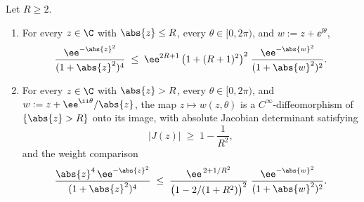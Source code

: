 \begin{lemma}\label{lem:weight-shift}
Let $R \ge 2$.
\begin{enumerate}[\rm(i)]
\item For every $z \in \C$ with $\abs{z}\le R$, every $\theta \in
[0,2\pi)$, and $w := z + \ee^{\ii\theta}$,
\begin{equation}\label{eq:weight-shift-bd}
\frac{\ee^{-\abs{z}^{2}}}{(1+\abs{z}^{2})^{4}}
\;\le\;
\ee^{2R+1}\,\bigl(1+(R+1)^{2}\bigr)^{2}\;
\frac{\ee^{-\abs{w}^{2}}}{(1+\abs{w}^{2})^{2}}.
\end{equation}
\item For every $z \in \C$ with $\abs{z} > R$, every $\theta \in
[0,2\pi)$, and $w := z + \ee^{\ii\theta}/\abs{z}$, the map $z \mapsto
w(z,\theta)$ is a $C^{\infty}$-diffeomorphism of $\{\abs{z}>R\}$ onto
its image, with absolute Jacobian determinant satisfying
\[
\bigl\lvert J(z)\bigr\rvert \;\ge\; 1 - \frac{1}{R^{2}},
\]
and the weight comparison
\begin{equation}\label{eq:weight-shift-out}
\frac{\abs{z}^{4}\,\ee^{-\abs{z}^{2}}}{(1+\abs{z}^{2})^{4}}
\;\le\;
\frac{\ee^{\,2 + 1/R^{2}}}{\bigl(1-2/(1+R^{2})\bigr)^{2}}\;
\frac{\ee^{-\abs{w}^{2}}}{(1+\abs{w}^{2})^{2}}.
\end{equation}
\end{enumerate}
\end{lemma}

